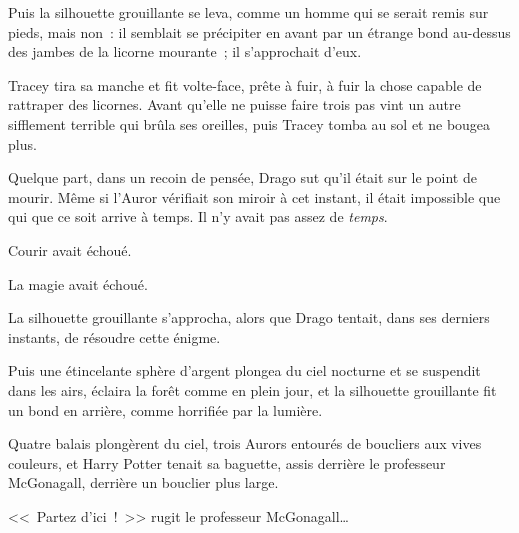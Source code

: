 Puis la silhouette grouillante se leva, comme un homme qui se serait remis sur pieds, mais non~: il semblait se précipiter en avant par un étrange bond au-dessus des jambes de la licorne mourante~; il s'approchait d'eux.

Tracey tira sa manche et fit volte-face, prête à fuir, à fuir la chose capable de rattraper des licornes. Avant qu'elle ne puisse faire trois pas vint un autre sifflement terrible qui brûla ses oreilles, puis Tracey tomba au sol et ne bougea plus.

Quelque part, dans un recoin de pensée, Drago sut qu'il était sur le point de mourir. Même si l'Auror vérifiait son miroir à cet instant, il était impossible que qui que ce soit arrive à temps. Il n'y avait pas assez de \emph{temps}.

Courir avait échoué.

La magie avait échoué.

La silhouette grouillante s'approcha, alors que Drago tentait, dans ses derniers instants, de résoudre cette énigme.

Puis une étincelante sphère d'argent plongea du ciel nocturne et se suspendit dans les airs, éclaira la forêt comme en plein jour, et la silhouette grouillante fit un bond en arrière, comme horrifiée par la lumière.

Quatre balais plongèrent du ciel, trois Aurors entourés de boucliers aux vives couleurs, et Harry Potter tenait sa baguette, assis derrière le professeur McGonagall, derrière un bouclier plus large.

<<~Partez d'ici~!~>> rugit le professeur McGonagall…

